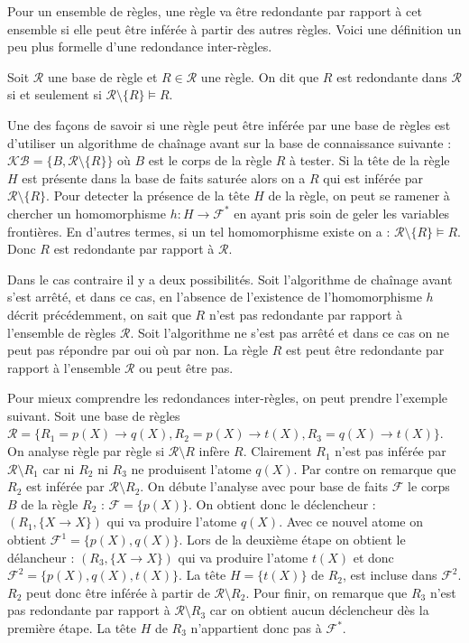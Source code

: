 \par Pour un ensemble de règles, une règle va être redondante par rapport à cet ensemble si elle peut être inférée à partir des autres règles. Voici une définition un peu plus formelle d'une redondance inter-règles.

\begin{definition}
    Soit $\mathcal{R}$ une base de règle et $R \in \mathcal{R}$ une règle. On dit que $R$ est redondante dans $\mathcal{R}$ si et seulement si $\mathcal{R} \setminus\{R\} \vDash R$.
\end{definition}

\par Une des façons de savoir si une règle peut être inférée par une base de règles est d'utiliser un algorithme de chaînage avant sur la base de connaissance suivante : $\mathcal{KB} = \{B, \mathcal{R} \setminus \{R\}\} $ où $B$ est le corps de la règle $R$ à tester. Si la tête de la règle $H$ est présente dans la base de faits saturée alors on a $R$ qui est inférée par $\mathcal{R} \setminus \{R\}$. Pour detecter la présence de la tête $H$ de la règle, on peut se ramener à chercher un homomorphisme $h : H \rightarrow \mathcal{F}^*$ en ayant pris soin de geler les variables frontières. En d'autres termes, si un tel homomorphisme existe on a : $\mathcal{R} \setminus \{R\} \models R$. Donc $R$ est redondante par rapport à $\mathcal{R}$. 
\par Dans le cas contraire il y a deux possibilités. Soit l'algorithme de chaînage avant s'est arrêté, et dans ce cas, en l'absence de l'existence de l'homomorphisme $h$ décrit précédemment, on sait que $R$ n'est pas redondante par rapport à l'ensemble de règles $\mathcal{R}$. Soit l'algorithme ne s'est pas arrêté et dans ce cas on ne peut pas répondre par oui où par non. La règle $R$ est peut être redondante par rapport à l'ensemble $\mathcal{R}$ ou peut être pas.

\par Pour mieux comprendre les redondances inter-règles, on peut prendre l'exemple suivant. Soit une base de règles $\mathcal{R} = \{R_1 = p(X) \rightarrow q(X), R_2 = p(X) \rightarrow t(X), R_3 = q(X) \rightarrow t(X)\}$. On analyse règle par règle si $\mathcal{R} \setminus R$ infère $R$. Clairement $R_1$ n'est pas inférée par $\mathcal{R} \setminus R_1$ car ni $R_2$ ni $R_3$ ne produisent l'atome $q(X)$. Par contre on remarque que $R_2$ est inférée par $\mathcal{R} \setminus R_2$. On débute l'analyse avec pour base de faits $\mathcal{F}$ le corps $B$ de la règle $R_2$ : $\mathcal{F} = \{p(X)\}$. On obtient donc le déclencheur : $(R_1, \{X \rightarrow X\})$ qui va produire l'atome $q(X)$. Avec ce nouvel atome on obtient $\mathcal{F}^1 = \{p(X), q(X)\}$. Lors de la deuxième étape on obtient le délancheur : $(R_3, \{X \rightarrow X\})$ qui va produire l'atome $t(X)$ et donc $\mathcal{F}^2 =  \{p(X), q(X), t(X)\}$. La tête $H = \{t(X)\}$ de $R_2$, est incluse dans $\mathcal{F}^2$. $R_2$ peut donc être inférée à partir de $\mathcal{R}\setminus R_2$. Pour finir, on remarque que $R_3$ n'est pas redondante par rapport à $\mathcal{R} \setminus R_3$ car on obtient aucun déclencheur dès la première étape. La tête $H$ de $R_3$ n'appartient donc pas à $\mathcal{F}^*$.



